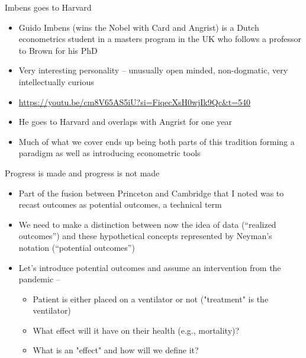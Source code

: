 \documentclass{beamer}
\begin{document}
\begin{frame}{Imbens goes to Harvard}

\begin{itemize}

\item Guido Imbens (wins the Nobel with Card and Angrist) is a Dutch econometrics student in a masters program in the UK who follows a professor to Brown for his PhD
\item Very interesting personality -- unusually open minded, non-dogmatic, very intellectually curious
\item \url{https://youtu.be/cm8V65AS5iU?si=FiqecXsH0wjIk9Qc&t=540}
\item He goes to Harvard and overlaps with Angrist for one year
\item Much of what we cover ends up being both parts of this tradition forming a paradigm as well as introducing econometric tools

\end{itemize}

\end{frame}

















\begin{frame}{Progress is made and progress is not made}

\begin{itemize}

\item Part of the fusion between Princeton and Cambridge that I noted was to recast outcomes as potential outcomes, a technical term
\item We need to make a distinction between now the idea of data (``realized outcomes'') and these hypothetical concepts represented by Neyman's notation (``potential outcomes'')
\item Let's introduce potential outcomes and assume an intervention from the pandemic -- 
	\begin{itemize}
	\item Patient is either placed on a ventilator or not ("treatment" is the ventilator)
	\item What effect will it have on their health (e.g., mortality)? 
	\item What is an "effect" and how will we define it?
	\end{itemize}

\end{itemize}


\end{frame}
\end{document}
